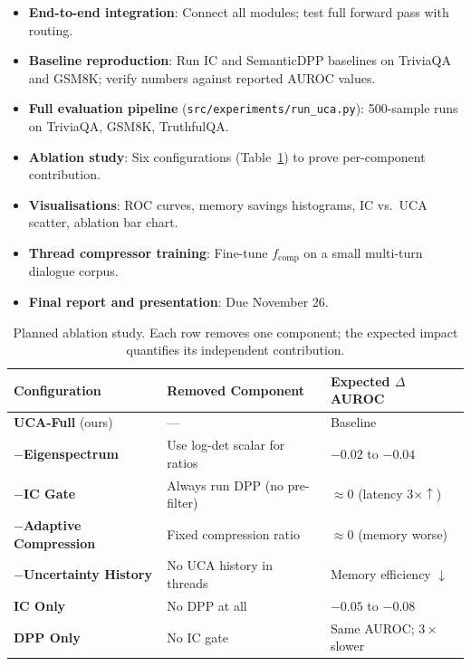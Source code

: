 \documentclass[11pt, a4paper]{article}
\begin{document}
\begin{itemize}[leftmargin=*, itemsep=3pt]
  \item \textbf{End-to-end integration}: Connect all modules; test full forward pass with routing.
  \item \textbf{Baseline reproduction}: Run IC and SemanticDPP baselines on TriviaQA and GSM8K; verify numbers against reported AUROC values.
  \item \textbf{Full evaluation pipeline} (\texttt{src/experiments/run\_uca.py}): 500-sample runs on TriviaQA, GSM8K, TruthfulQA.
  \item \textbf{Ablation study}: Six configurations (Table~\ref{tab:ablation}) to prove per-component contribution.
  \item \textbf{Visualisations}: ROC curves, memory savings histograms, IC vs.\ UCA scatter, ablation bar chart.
  \item \textbf{Thread compressor training}: Fine-tune $f_{\text{comp}}$ on a small multi-turn dialogue corpus.
  \item \textbf{Final report and presentation}: Due November 26.
\end{itemize}

\begin{table}[h]
\centering
\caption{Planned ablation study. Each row removes one component; the expected impact quantifies its independent contribution.}
\label{tab:ablation}
\begin{tabular}{lll}
\toprule
\textbf{Configuration} & \textbf{Removed Component} & \textbf{Expected $\Delta$AUROC} \\
\midrule
\textbf{UCA-Full} (ours) & --- & Baseline \\
\textbf{$-$Eigenspectrum} & Use log-det scalar for ratios & $-0.02$ to $-0.04$ \\
\textbf{$-$IC Gate} & Always run DPP (no pre-filter) & $\approx 0$ (latency $3\times\uparrow$) \\
\textbf{$-$Adaptive Compression} & Fixed compression ratio & $\approx 0$ (memory worse) \\
\textbf{$-$Uncertainty History} & No UCA history in threads & Memory efficiency $\downarrow$ \\
\textbf{IC Only} & No DPP at all & $-0.05$ to $-0.08$ \\
\textbf{DPP Only} & No IC gate & Same AUROC; $3\times$ slower \\
\bottomrule
\end{tabular}
\end{table}
\end{document}
